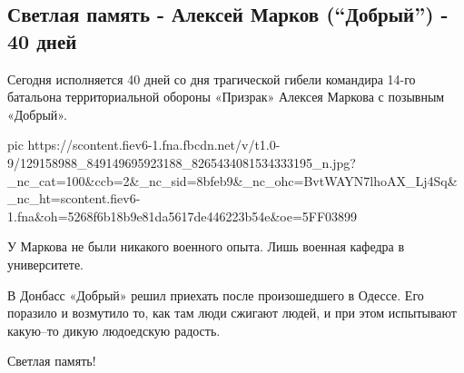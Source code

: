  
 
 
 
 

\subsection{Светлая память - Алексей Марков (\enquote{Добрый}) - 40 дней}
\label{sec:02_12_2020.fb.kiselev_ve.1.markov_prizrak_40_dnej}


Сегодня исполняется 40 дней со дня трагической гибели командира 14-го батальона
территориальной обороны «Призрак» Алексея Маркова с позывным «Добрый».

\ifcmt
pic https://scontent.fiev6-1.fna.fbcdn.net/v/t1.0-9/129158988_849149695923188_8265434081534333195_n.jpg?_nc_cat=100&ccb=2&_nc_sid=8bfeb9&_nc_ohc=BvtWAYN7lhoAX_Lj4Sq&_nc_ht=scontent.fiev6-1.fna&oh=5268f6b18b9e81da5617de446223b54e&oe=5FF03899
\fi

У Маркова не были никакого военного опыта. Лишь военная кафедра в университете.

В Донбасс «Добрый» решил приехать после произошедшего в Одессе. Его поразило и
возмутило то, как там люди сжигают людей, и при этом испытывают какую–то дикую
людоедскую радость.

Светлая память!
